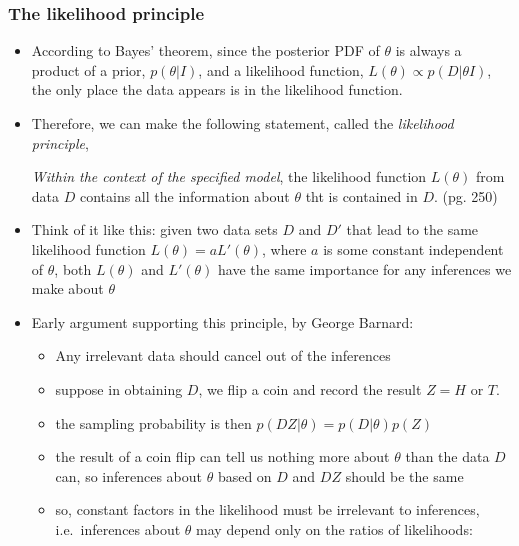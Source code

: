\documentclass[../jaynes_prob_theory_notes.tex]{subfiles}
\begin{document}
            \subsubsection{The likelihood principle}
                \begin{itemize}
                    \item According to Bayes' theorem, since the posterior PDF of $\theta$ is always a product of a prior, $p(\theta | I)$, and a likelihood function, $L(\theta) \propto p(D|{\theta}I)$, the only place the data appears is in the likelihood function.
                    \item Therefore, we can make the following statement, called the \textit{likelihood principle},
                        \begin{displayquote}
                            \textit{Within the context of the specified model}, the likelihood function $L(\theta)$ from data $D$ contains all the information about $\theta$ tht is contained in $D$. (pg. 250)
                        \end{displayquote}
                    \item Think of it like this: given two data sets $D$ and $D'$ that lead to the same likelihood function $L(\theta) = aL'(\theta)$, where $a$ is some constant independent of $\theta$, both $L(\theta)$ and $L'(\theta)$ have the same importance for any inferences we make about $\theta$
                    \item Early argument supporting this principle, by George Barnard:
                        \begin{itemize}
                            \item Any irrelevant data should cancel out of the inferences
                            \item suppose in obtaining $D$, we flip a coin and record the result $Z = H$ or $T$.
                            \item the sampling probability is then $p(DZ|\theta) = p(D|\theta)p(Z)$
                            \item the result of a coin flip can tell us nothing more about $\theta$ than the data $D$ can, so inferences about $\theta$ based on $D$ and $DZ$ should be the same
                            \item so, constant factors in the likelihood must be irrelevant to inferences, i.e.\ inferences about $\theta$ may depend only on the ratios of likelihoods:
                                \begin{equation*}

\end{equation*}
\end{itemize}
\end{itemize}
\end{document}
